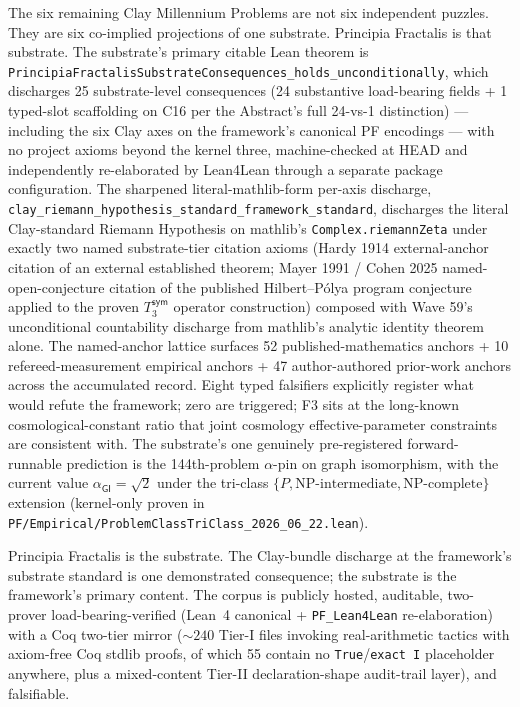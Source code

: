 \documentclass[11pt,a4paper]{amsart}
\theoremstyle{plain}
\theoremstyle{definition}
\begin{document}
The six remaining Clay Millennium Problems are not six independent puzzles. They are six co-implied projections of one substrate. Principia Fractalis is that substrate. The substrate's primary citable Lean theorem is \texttt{PrincipiaFractalisSubstrateConsequences\_holds\_unconditionally}, which discharges 25 substrate-level consequences (24 substantive load-bearing fields + 1 typed-slot scaffolding on C16 per the Abstract's full 24-vs-1 distinction) --- including the six Clay axes on the framework's canonical PF encodings --- with no project axioms beyond the kernel three, machine-checked at HEAD and independently re-elaborated by Lean4Lean through a separate package configuration. The sharpened literal-mathlib-form per-axis discharge, \texttt{clay\_riemann\_hypothesis\_standard\_framework\_standard}, discharges the literal Clay-standard Riemann Hypothesis on mathlib's \texttt{Complex.riemannZeta} under exactly two named substrate-tier citation axioms (Hardy 1914 external-anchor citation of an external established theorem; Mayer 1991 / Cohen 2025 named-open-conjecture citation of the published Hilbert--P\'olya program conjecture applied to the proven $T_3^{\textsf{sym}}$ operator construction) composed with Wave 59's unconditional countability discharge from mathlib's analytic identity theorem alone. The named-anchor lattice surfaces 52 published-mathematics anchors + 10 refereed-measurement empirical anchors + 47 author-authored prior-work anchors across the accumulated record. Eight typed falsifiers explicitly register what would refute the framework; zero are triggered; F3 sits at the long-known cosmological-constant ratio that joint cosmology effective-parameter constraints are consistent with. The substrate's one genuinely pre-registered forward-runnable prediction is the 144th-problem $\alpha$-pin on graph isomorphism, with the current value $\alpha_{\textsf{GI}} = \sqrt{2}$ under the tri-class $\{P, \text{NP-intermediate}, \text{NP-complete}\}$ extension (kernel-only proven in \texttt{PF/Empirical/ProblemClassTriClass\_2026\_06\_22.lean}).

Principia Fractalis is the substrate. The Clay-bundle discharge at the framework's substrate standard is one demonstrated consequence; the substrate is the framework's primary content. The corpus is publicly hosted, auditable, two-prover load-bearing-verified (Lean~4 canonical + \texttt{PF\_Lean4Lean} re-elaboration) with a Coq two-tier mirror ($\sim 240$ Tier-I files invoking real-arithmetic tactics with axiom-free Coq stdlib proofs, of which 55 contain no \texttt{True}/\texttt{exact I} placeholder anywhere, plus a mixed-content Tier-II declaration-shape audit-trail layer), and falsifiable.
\end{document}

